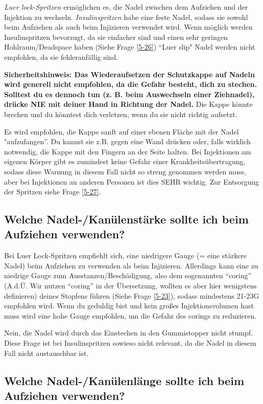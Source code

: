 \documentclass{article}
\begin{document}
\textit{Luer lock-Spritzen} ermöglichen es, die Nadel zwischen dem Aufziehen und der Injektion zu wechseln. \textit{Insulinspritzen} habe eine feste Nadel, sodass sie sowohl beim Aufziehen als auch beim Injizieren verwendet wird. Wenn möglich werden Insulinspritzen bevorzugt, da sie einfacher sind und einen sehr geringen Hohlraum/Deadspace haben (Siehe Frage \ref{5-26}) “Luer slip" Nadel werden nicht empfohlen, da sie fehleranfällig sind.

\textbf{Sicherheitshinweis: Das Wiederaufsetzen der Schutzkappe auf Nadeln wird generell nicht empfohlen, da die Gefahr besteht, dich zu stechen. Solltest du es dennoch tun (z. B. beim Auswechseln einer Ziehnadel), drücke NIE mit deiner Hand in Richtung der Nadel.} Die Kappe könnte brechen und du könntest dich verletzen, wenn du sie nicht richtig aufsetzt. 

Es wird empfohlen, die Kappe sanft auf einer ebenen Fläche mit der Nadel "aufzufangen”. Du kannst sie z.B. gegen eine Wand drücken oder, falls wirklich notwendig, die Kappe mit den Fingern an der Seite halten. Bei Injektionen am eigenen Körper gibt es zumindest keine Gefahr einer Krankheitsübertragung, sodass diese Warnung in diesem Fall nicht so streng genommen werden muss, aber bei Injektionen an anderen Personen ist dies SEHR wichtig. Zur Entsorgung der Spritzen siehe Frage \ref{5-27}.

\subsection{Welche Nadel-/Kanülenstärke sollte ich beim Aufziehen verwenden?}

Bei Luer Lock-Spritzen empfiehlt sich, eine niedrigere Gauge (= eine stärkere Nadel) beim Aufziehen zu verwenden als beim Injizieren. Allerdings kann eine zu niedrige Gauge zum Ausstanzen/Beschädigung, also dem sogenannten “coring” (A.d.Ü. Wir nutzen “coring” in der Übersetzung, wollten es aber hier wenigstens definieren) deines Stopfens führen (Siehe Frage \ref{5-23}), sodass mindestens 21-23G empfohlen wird. Wenn du geduldig bist und kein großes Injektionsvolumen hast muss wird eine hohe Gauge empfohlen, um die Gefahr des corings zu reduzieren. 

Nein, die Nadel wird durch das Einstechen in den Gummistopper nicht stumpf. Diese Frage ist bei Insulinspritzen sowieso nicht relevant, da die Nadel in diesem Fall nicht austauschbar ist.

\subsection{Welche Nadel-/Kanülenlänge sollte ich beim Aufziehen verwenden?}
\end{document}
